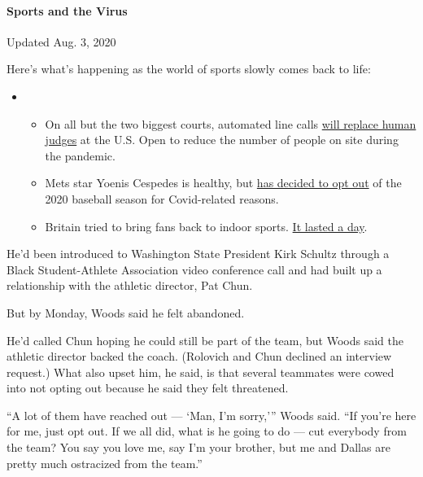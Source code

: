 \hypertarget{sports-and-the-virus}{%
\paragraph{Sports and the Virus}\label{sports-and-the-virus}}

Updated Aug. 3, 2020

Here's what's happening as the world of sports slowly comes back to
life:

\begin{itemize}
\item
  \begin{itemize}
  \tightlist
  \item
    On all but the two biggest courts, automated line calls
    \href{https://www.nytimes.com/2020/08/03/sports/tennis/us-open-hawkeye-line-judges.html?action=click\&pgtype=Article\&state=default\&region=MAIN_CONTENT_2\&context=storylines_keepup}{will
    replace human judges} at the U.S. Open to reduce the number of
    people on site during the pandemic.
  \item
    Mets star Yoenis Cespedes is healthy, but
    \href{https://www.nytimes.com/2020/08/02/sports/baseball/Yoenis-cespedes-opt-out-rule.html?action=click\&pgtype=Article\&state=default\&region=MAIN_CONTENT_2\&context=storylines_keepup}{has
    decided to opt out} of the 2020 baseball season for Covid-related
    reasons.
  \item
    Britain tried to bring fans back to indoor sports.
    \href{https://www.nytimes.com/2020/08/02/sports/snooker-world-championship.html?action=click\&pgtype=Article\&state=default\&region=MAIN_CONTENT_2\&context=storylines_keepup}{It
    lasted a day}.
  \end{itemize}
\end{itemize}

He'd been introduced to Washington State President Kirk Schultz through
a Black Student-Athlete Association video conference call and had built
up a relationship with the athletic director, Pat Chun.

But by Monday, Woods said he felt abandoned.

He'd called Chun hoping he could still be part of the team, but Woods
said the athletic director backed the coach. (Rolovich and Chun declined
an interview request.) What also upset him, he said, is that several
teammates were cowed into not opting out because he said they felt
threatened.

``A lot of them have reached out --- `Man, I'm sorry,''' Woods said.
``If you're here for me, just opt out. If we all did, what is he going
to do --- cut everybody from the team? You say you love me, say I'm your
brother, but me and Dallas are pretty much ostracized from the team.''

